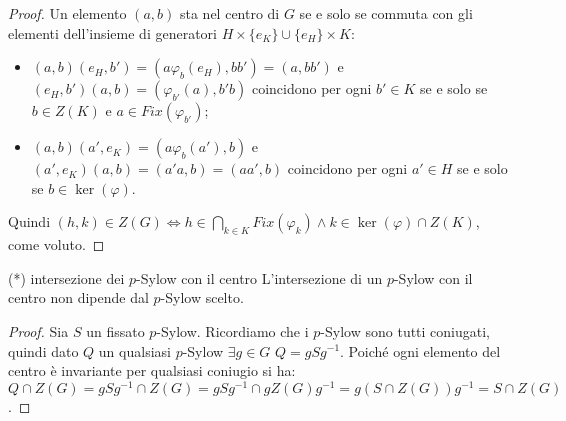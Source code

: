 \begin{proof}
    Un elemento $(a, b)$ sta nel centro di $G$ se e solo se commuta con gli elementi dell'insieme di generatori $H \times \{e_K\} \cup \{e_H\} \times K$:
    \begin{itemize}
        \item $(a, b)(e_H, b') = (a \varphi_b(e_H), b b') = (a, b b')$ e $(e_H, b')(a, b) = (\varphi_{b'}(a), b' b)$ coincidono per ogni $b' \in K$ se e solo se $b \in Z(K)$ e $a \in Fix(\varphi_{b'})$;
        \item $(a, b)(a', e_K) = (a \varphi_b(a'), b)$ e $(a', e_K)(a, b) = (a' a, b) = (a a', b)$ coincidono per ogni $a' \in H$ se e solo se $b \in \ker(\varphi)$.
    \end{itemize}
    Quindi $(h,k) \in Z(G) \Leftrightarrow h \in \bigcap_{k \in K} Fix(\varphi_k) \land k \in \ker(\varphi) \cap Z(K)$, come voluto.
\end{proof}
\begin{proposition}{(*) intersezione dei $p$-Sylow con il centro}
    L'intersezione di un $p$-Sylow con il centro non dipende dal $p$-Sylow scelto.
\end{proposition}
\begin{proof}
    Sia $S$ un fissato $p$-Sylow. Ricordiamo che i $p$-Sylow sono tutti coniugati, quindi dato $Q$ un qualsiasi $p$-Sylow $\exists g \in G$ $Q = gSg^{-1}$. Poiché ogni elemento del centro è invariante per qualsiasi coniugio si ha: $Q \cap Z(G) = gSg^{-1} \cap Z(G) = gSg^{-1} \cap gZ(G)g^{-1} = g(S \cap Z(G))g^{-1} = S \cap Z(G)$. 
\end{proof} 

